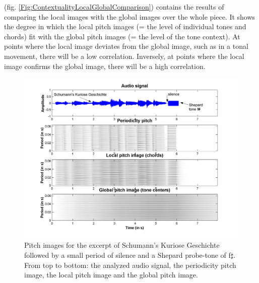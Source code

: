 (fig. \ref{Fig:ContextualityLocalGlobalComparison}) contains the
results of comparing the local images with the global images over
the whole piece. It shows the degree in which the local pitch
images (= the level of individual tones and chords) fit with the
global pitch images (= the level of the tone context). At points
where the local image deviates from the global image, such as in a
tonal movement, there will be a low correlation. Inversely, at
points where the local image confirms the global image, there will
be a high correlation.\\

\begin{figure}[h]
    \centering
    \includegraphics[width=\IPEMDefaultFigureWidth]{Graphics/ContextualityPitchImages}
    \caption{Pitch images for the excerpt of Schumann's Kuriose
    Geschichte followed by a small period of silence and a Shepard
    probe-tone of f$\sharp$. From top to bottom: the analyzed
    audio signal, the periodicity pitch image, the local pitch image and
    the global pitch image.} \label{Fig:ContextualityPitchImages}
\end{figure}

